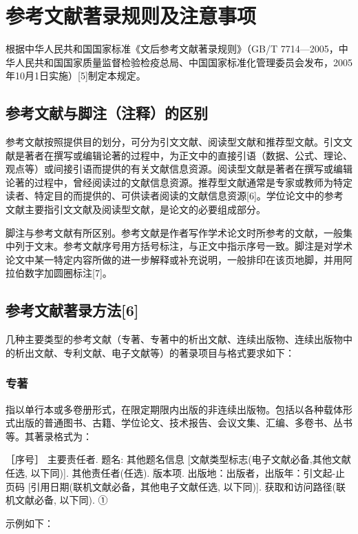 \chapter{参考文献著录规则及注意事项}

根据中华人民共和国国家标准《文后参考文献著录规则》（GB/T 7714—2005，中华人民共和国国家质量监督检验检疫总局、中国国家标准化管理委员会发布，2005年10月1日实施）[5]制定本规定。

\section{参考文献与脚注（注释）的区别}

参考文献按照提供目的划分，可分为引文文献、阅读型文献和推荐型文献。引文文献是著者在撰写或编辑论著的过程中，为正文中的直接引语（数据、公式、理论、观点等）或间接引语而提供的有关文献信息资源。阅读型文献是著者在撰写或编辑论著的过程中，曾经阅读过的文献信息资源。推荐型文献通常是专家或教师为特定读者、特定目的而提供的、可供读者阅读的文献信息资源[6]。学位论文中的参考文献主要指引文文献及阅读型文献，是论文的必要组成部分。

脚注与参考文献有所区别。参考文献是作者写作学术论文时所参考的文献，一般集中列于文末。参考文献序号用方括号标注，与正文中指示序号一致。脚注是对学术论文中某一特定内容所做的进一步解释或补充说明，一般排印在该页地脚，并用阿拉伯数字加圆圈标注[7]。

\section{参考文献著录方法[6]}

几种主要类型的参考文献（专著、专著中的析出文献、连续出版物、连续出版物中的析出文献、专利文献、电子文献等）的著录项目与格式要求如下：

\subsection{专著}

指以单行本或多卷册形式，在限定期限内出版的非连续出版物。包括以各种载体形式出版的普通图书、古籍、学位论文、技术报告、会议文集、汇编、多卷书、丛书等。其著录格式为：

\kaishu
［序号］ 主要责任者. 题名: 其他题名信息 [文献类型标志(电子文献必备,其他文献任选, 以下同)]. 其他责任者(任选). 版本项. 出版地：出版者，出版年：引文起-止页码 [引用日期(联机文献必备，其他电子文献任选, 以下同)]. 获取和访问路径(联机文献必备, 以下同). ①

\songti
示例如下：

